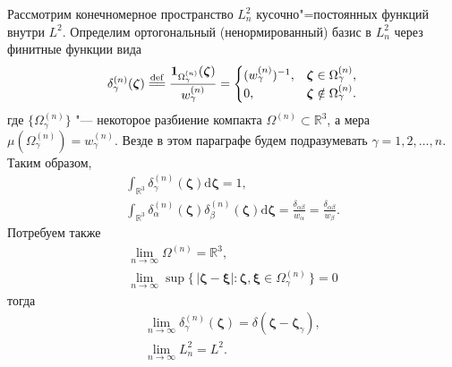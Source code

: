 \documentclass{article}
\newcommand{\dd}{\mathrm{d}}
\newcommand{\dzeta}{\boldsymbol{\dd\zeta}}
\newcommand{\bzeta}{\boldsymbol{\zeta}}
\newcommand{\bxi}{\boldsymbol{\xi}}
\newcommand{\Set}[2]{\{\,{#1}:{#2}\,\}}
\newcommand{\eqdef}{\overset{\mathrm{def}}{=\joinrel=}}
\begin{document}
Рассмотрим конечномерное пространство \(L^2_n\) кусочно"=постоянных функций внутри \(L^2\).
Определим ортогональный (ненормированный) базис в \(L^2_n\) через финитные функции вида
\begin{equation}\label{eq:delta_definition}
    \delta^{(n)}_\gamma(\bzeta) \eqdef \frac{\mathbf{1}_{\Omega^{(n)}_\gamma}(\bzeta)}{w^{(n)}_\gamma} =
    \begin{cases}
        (w^{(n)}_\gamma)^{-1}, & \bzeta\in\Omega^{(n)}_\gamma, \\
        0, & \bzeta\notin\Omega^{(n)}_\gamma. \\
    \end{cases}
\end{equation}
где \(\{\Omega^{(n)}_\gamma\}\) "--- некоторое разбиение компакта \(\Omega^{(n)}\subset\mathbb{R}^3\),
а мера \(\mu(\Omega^{(n)}_\gamma) = w^{(n)}_\gamma\). Везде в этом параграфе будем подразумевать \(\gamma=1,2,\dots,n\).
Таким образом,
\begin{gather}
    \int_{\mathbb{R}^3} \delta^{(n)}_\gamma(\bzeta) \dzeta = 1, \label{eq:L2n_norm}\\
    \int_{\mathbb{R}^3} \delta^{(n)}_\alpha(\bzeta) \delta^{(n)}_\beta(\bzeta) \dzeta =
    \frac{\delta_{\alpha\beta}}{w_\alpha} = \frac{\delta_{\alpha\beta}}{w_\beta}. \label{eq:L2n_orth}
\end{gather}
Потребуем также
\begin{gather}
    \lim_{n\to\infty} \Omega^{(n)} = \mathbb{R}^3, \label{eq:Omega_limit}\\
    \lim_{n\to\infty} \sup\Set{|\bzeta-\bxi|}{\bzeta,\bxi\in\Omega^{(n)}_\gamma} = 0 \label{eq:diameter_limit}
\end{gather}
тогда
\begin{gather}
    \lim_{n\to\infty} \delta^{(n)}_\gamma(\bzeta) = \delta(\bzeta-\bzeta_\gamma), \label{eq:delta_limit}\\
    \lim_{n\to\infty} L^2_n = L^2. \label{eq:subspace_limit}
\end{gather}
\end{document}
